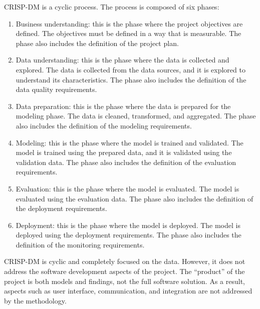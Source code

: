 CRISP-DM is a cyclic process.  The process is composed of six phases:
\begin{enumerate}
  \item Business understanding: this is the phase where the project objectives are
    defined.  The objectives must be defined in a way that is measurable.  The phase also
    includes the definition of the project plan.
  \item Data understanding: this is the phase where the data is collected and explored.
    The data is collected from the data sources, and it is explored to understand its
    characteristics.  The phase also includes the definition of the data quality
    requirements.
  \item Data preparation: this is the phase where the data is prepared for the modeling
    phase.  The data is cleaned, transformed, and aggregated.  The phase also includes the
    definition of the modeling requirements.
  \item Modeling: this is the phase where the model is trained and validated.  The model is
    trained using the prepared data, and it is validated using the validation data.  The
    phase also includes the definition of the evaluation requirements.
  \item Evaluation: this is the phase where the model is evaluated.  The model is evaluated
    using the evaluation data.  The phase also includes the definition of the deployment
    requirements.
  \item Deployment: this is the phase where the model is deployed.  The model is deployed
    using the deployment requirements.  The phase also includes the definition of the
    monitoring requirements.
\end{enumerate}

CRISP-DM is cyclic and completely focused on the data.  However, it does not address the
software development aspects of the project.  The ``product'' of the project is both
models and findings, not the full software solution.  As a result, aspects such as user
interface, communication, and integration are not addressed by the methodology.

